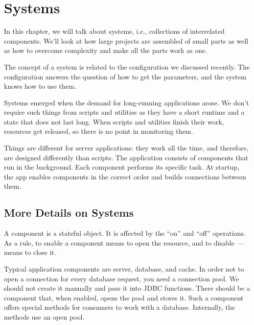 \chapter{Systems}

\label{chapter-systems}


\begin{teaser}
In this chapter, we will talk about systems, i.e., collections of interrelated components. We'll look at how large projects are assembled of small parts as well as how to overcome complexity and make all the parts work as one.
\end{teaser}

The concept of a system is related to the configuration we discussed recently. The configuration answers the question of how to get the parameters, and the system knows how to use them.

Systems emerged when the demand for long-running applications arose. We don't require such things from scripts and utilities as they have a short runtime and a state that does not last long. When scripts and utilities finish their work, resources get released, so there is no point in monitoring them.

Things are different for server applications: they work all the time, and therefore, are designed differently than scripts. The application consists of components that run in the background. Each component performs its specific task. At startup, the app enables components in the correct order and builds connections between them.

\section{More Details on Systems}


A component is a stateful object. It is affected by the ``on'' and ``off'' operations. As a rule, to enable a component means to open the resource, and to disable~--- means to close it.


Typical application components are server, database, and cache. In order not to open a connection for every database request, you need a connection pool. We should not create it manually and pass it into JDBC functions. There should be a component that, when enabled, opens the pool and stores it. Such a component offers special methods for consumers to work with a database. Internally, the methods use an open pool.

